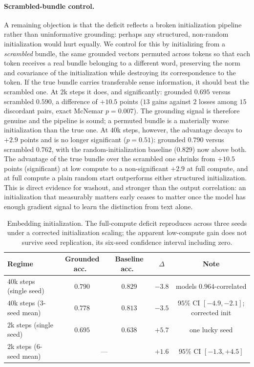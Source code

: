 \documentclass[twoside,11pt]{article}
\begin{document}
\paragraph{Scrambled-bundle control.}
A remaining objection is that the deficit reflects a broken initialization pipeline rather than uninformative grounding: perhaps any structured, non-random initialization would hurt equally. We control for this by initializing from a \emph{scrambled} bundle, the same grounded vectors permuted across tokens so that each token receives a real bundle belonging to a different word, preserving the norm and covariance of the initialization while destroying its correspondence to the token. If the true bundle carries transferable sense information, it should beat the scrambled one. At $2$k steps it does, and significantly: grounded $0.695$ versus scrambled $0.590$, a difference of $+10.5$ points ($13$ gains against $2$ losses among $15$ discordant pairs, exact McNemar $p = 0.007$). The grounding signal is therefore genuine and the pipeline is sound; a permuted bundle is a materially worse initialization than the true one. At $40$k steps, however, the advantage decays to $+2.9$ points and is no longer significant ($p = 0.51$): grounded $0.790$ versus scrambled $0.762$, with the random-initialization baseline ($0.829$) now above both. The advantage of the true bundle over the scrambled one shrinks from $+10.5$ points (significant) at low compute to a non-significant $+2.9$ at full compute, and at full compute a plain random start outperforms either structured initialization. This is direct evidence for washout, and stronger than the output correlation: an initialization that measurably matters early ceases to matter once the model has enough gradient signal to learn the distinction from text alone.

\begin{table}[t]
\centering
\begin{tabular}{lcccc}
\toprule
Regime & Grounded acc.\ & Baseline acc.\ & $\Delta$ & Note \\
\midrule
$40$k steps (single seed) & $0.790$ & $0.829$ & $-3.8$ & models $0.964$-correlated \\
$40$k steps (3-seed mean) & $0.778$ & $0.813$ & $-3.5$ & $95\%$ CI $[-4.9, -2.1]$; corrected init \\
$2$k steps (single seed)  & $0.695$ & $0.638$ & $+5.7$ & one lucky seed \\
$2$k steps (6-seed mean)  & \multicolumn{2}{c}{---} & $+1.6$ & $95\%$ CI $[-1.3, +4.5]$ \\
\bottomrule
\end{tabular}
\caption{Embedding initialization. The full-compute deficit reproduces across three seeds under a corrected initialization scaling; the apparent low-compute gain does not survive seed replication, its six-seed confidence interval including zero.}
\label{tab:init}
\end{table}
\end{document}
